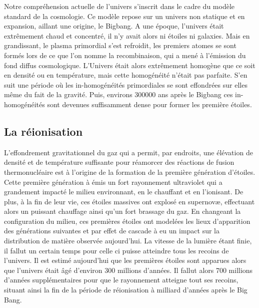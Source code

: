 Notre compréhension actuelle de l'univers s'inscrit dans le cadre du modèle standard de la cosmologie.
Ce modèle repose sur un univers non statique et en expansion, aillant une origine, le Bigbang.
A une époque, l'univers était extrêmement chaud et concentré, il n'y avait alors ni étoiles ni galaxies.
Mais en grandissant, le plasma primordial s'est refroidit, les premiers atomes se sont formés lors de ce que l'on nomme la recombinaison, qui a mené à l'émission du fond diffus cosmologique.
L'Univers était alors extrêmement homogène que ce soit en densité ou en température, mais cette homogénéité n'était pas parfaite.
S'en suit une période où les in-homogénéités primordiales se sont effondrées sur elles même du fait de la gravité.
Puis, environs 300000 ans après le Bigbang ces in-homogénéités sont devenues suffisamment dense pour former les première étoiles.

\subsection*{La réionisation}
L'effondrement gravitationnel du gaz qui a permit, par endroits, une élévation de densité et de température suffisante pour réamorcer des réactions de fusion thermonucléaire est à l'origine de la formation de la première génération d'étoiles.
Cette première génération à émis un fort rayonnement ultraviolet qui a grandement impacté le milieu environnant, en le chauffant et en l'ionisant. %
De plus, à la fin de leur vie, ces étoiles massives ont explosé en supernovæ, effectuant alors un puissant chauffage ainsi qu'un fort brassage du gaz.
En changeant la configuration du milieu, ces premières étoiles ont modelées les lieux d'apparition des générations suivantes et par effet de cascade à eu un impact sur la distribution de matière observée aujourd'hui.
La vitesse de la lumière étant finie, il fallut un certain temps pour celle ci puisse atteindre tous les recoins de l'univers. 
Il est estimé aujourd'hui que les premières étoiles sont apparues alors que l'univers était âgé d'environ 300 millions d'années. 
Il fallut alors 700 millions d'années supplémentaires pour que le rayonnement atteigne tout ses recoins, situant ainsi la fin de la période de réionisation à milliard d'années après le Big Bang.

